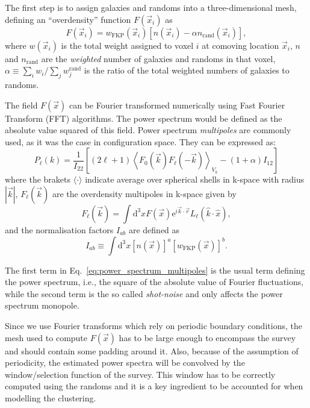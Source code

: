 The first step is to assign galaxies and randoms into a three-dimensional mesh, 
defining an ``overdensity'' function $F(\vec{x}_i)$ as 
\begin{equation}
    F(\vec{x}_i) = w_\text{FKP}(\vec{x}_i) \left[ n(\vec{x}_i) - \alpha n_\text{rand}(\vec{x}_i) \right],
    \label{eq:overdensity_fourier}
\end{equation}
where $w(\vec{x}_i)$ is the total weight assigned to voxel $i$ at comoving location 
$\vec{x}_i$, $n$ and $n_\text{rand}$ are the \emph{weighted} number of galaxies and randoms in that voxel, 
$\alpha \equiv \sum_i w_i / \sum_j w^\text{rand}_j$ is the ratio of the total weighted numbers of galaxies to 
randoms. 

The field $F(\vec{x})$ can be Fourier transformed numerically using Fast Fourier Transform (FFT) 
algorithms. The power spectrum would be defined as the absolute value squared of this field. 
Power spectrum \emph{multipoles} are commonly 
used, as it was the case in configuration space. 
They can be expressed as: 
\begin{equation}
 P_\ell(k) = \frac{1}{I_{22}} \left[ (2\ell+1) \left\langle F_0(\vec{k})F_\ell(-\vec{k}) \right\rangle_{V_k} - (1+\alpha)I_{12} \right]
 \label{eq:power_spectrum_multipoles}
\end{equation}
where the brakets $\langle \cdot \rangle$ indicate average over spherical shells in k-space with radius $|\vec{k}|$, 
$F_\ell(\vec{k})$ are the overdensity multipoles in k-space given by 
\begin{equation}
    F_\ell(\vec{k}) = \int \text{d}^3x F(\vec{x}) \text{e}^{i \vec{k}\cdot \vec{r}} L_\ell( \hat{k} \cdot \hat{x}), 
\end{equation}
and the normalisation factors $I_{ab}$ are defined as 
\begin{equation}
 I_{ab} \equiv \int \text{d}^3 x [n(\vec{x})]^a [w_\text{FKP}(\vec{x})]^b. 
 \label{eq:normalisation_power_spectrum}
\end{equation}

The first term in Eq.~\ref{eq:power_spectrum_multipoles} is the usual term defining the power spectrum, i.e., 
the square of the absolute value of Fourier fluctuations, while the second term is the so called \emph{shot-noise} 
and only affects the power spectrum monopole. 

Since we use Fourier transforms which rely on periodic boundary conditions, the mesh used to compute $F(\vec{x})$
has to be large enough to encompass the survey and should contain some padding around it. 
Also, because of the assumption of periodicity, the estimated power spectra will be convolved by the window/selection function of the survey.
This window has to be correctly computed using the randoms and it is a key ingredient to be accounted for when modelling the clustering. 

